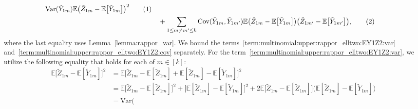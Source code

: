 \documentclass[twoside,11pt]{article}
\newcommand\numberthis{\addtocounter{equation}{1}\tag{\theequation}}
\newcommand{\rvTwo}{Y}
\newcommand{\rvThree}{Z}
\newcommand{\private}[1]{\tilde{#1}}
\newcommand{\mE}{\mathbb{E}} %
\newcommand{\alphabetSize}{k} %
\newcommand{\vectorIndex}{m}
\begin{document}
\begin{appendix}
\begin{itemize}
\begin{align*}
		\mathrm{Var}(\private{Y}_{1 \vectorIndex})
		\mE
		\bigl( %
		\private{\rvThree}_{1 \vectorIndex}
		-
		\mE
		\bigl[
		\private{\rvTwo}_{1 \vectorIndex}
		\bigr]
		\bigr)^2
		\numberthis
		\label{term:multinomial:upper:rappor_elltwo:EY1Z2:var}
		\\
		&\quad+
		\sum_{1 \leq \vectorIndex \neq \vectorIndex' \leq \alphabetSize}
		\mathrm{Cov}(\private{Y}_{1 \vectorIndex}, \private{Y}_{1 \vectorIndex'})
		\mE
		\bigl( %
		\private{\rvThree}_{1 \vectorIndex}
		-
		\mE
		\bigl[
		\private{\rvTwo}_{1 \vectorIndex}
		\bigr]
		\bigr)%
		\bigl( %
		\private{\rvThree}_{1 \vectorIndex'}
		-
		\mE
		\bigl[
		\private{\rvTwo}_{1 \vectorIndex'}
		\bigr]
		\bigr),%
		\numberthis
		\label{term:multinomial:upper:rappor_elltwo:EY1Z2:cov}
	\end{align*}
	where the last equality uses Lemma~\ref{lemma:rappor_var}.
	We bound the terms~\eqref{term:multinomial:upper:rappor_elltwo:EY1Z2:var} and~\eqref{term:multinomial:upper:rappor_elltwo:EY1Z2:cov} separately.
	For the term~\eqref{term:multinomial:upper:rappor_elltwo:EY1Z2:var}, we utilize the following equality that holds for each of $\vectorIndex \in [\alphabetSize]$:
	\begin{align*}
		\mE
		\bigl[ %
		\private{\rvThree}_{1 \vectorIndex}
		-
		\mE
		[
		\private{\rvTwo}_{1 \vectorIndex}
		]
		\bigr]^2
		&=
		\mE
		\bigl[ %
		\private{\rvThree}_{1 \vectorIndex}
		-
		\mE
		[
		\private{\rvThree}_{1 \vectorIndex}
		]
		+
		\mE
		[
		\private{\rvThree}_{1 \vectorIndex}
		]
		-
		\mE
		[
		\private{\rvTwo}_{1 \vectorIndex}
		]
		\bigr]^2
		\\&=
		\mE
		\bigl[ %
		\private{\rvThree}_{1 \vectorIndex}
		-
		\mE
		[
		\private{\rvThree}_{1 \vectorIndex}
		]
		\bigr]^2
		+
		\bigl[
		\mE
		[
		\private{\rvThree}_{1 \vectorIndex}
		]
		-
		\mE
		[
		\private{\rvTwo}_{1 \vectorIndex}
		]
		\bigr]^2
		+2
		\mE
		\bigl[ %
		\private{\rvThree}_{1 \vectorIndex}
		-
		\mE
		[
		\private{\rvThree}_{1 \vectorIndex}
		]
		\bigr]
		\bigl(
		\mE
		[
		\private{\rvThree}_{1 \vectorIndex}
		]
		-
		\mE
		[
		\private{\rvTwo}_{1 \vectorIndex}
		]
		\bigr)
		\\&=
		\mathrm{Var}(

\end{align*}
\end{itemize}
\end{appendix}
\end{document}
